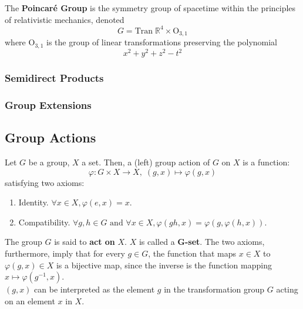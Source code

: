   \begin{example}
    The \textbf{Poincaré Group} is the symmetry group of spacetime within the principles of relativistic mechanics, denoted
    \begin{equation}
      G = \text{Tran}\; \mathbb{R}^{4} \times \text{O}_{3,1}
    \end{equation}
    where O$_{3,1}$ is the group of linear transformations preserving the polynomial 
    \begin{equation}
      x^{2} + y^{2} + z^{2} - t^{2}
    \end{equation}
  \end{example} 

\subsubsection{Semidirect Products} 

\subsubsection{Group Extensions}





\subsection{Group Actions}

  \begin{definition}
    Let $G$ be a group, $X$ a set. Then, a (left) group action of $G$ on $X$ is a function: 
    \begin{equation}
      \varphi: G \times X \longrightarrow X, \; (g,x) \longmapsto \varphi(g,x)
    \end{equation}
    satisfying two axioms:
    \begin{enumerate}
      \item Identity. $\forall x \in X, \varphi(e, x) = x$. 
      \item Compatibility. $\forall g, h \in G \text{ and } \forall x \in X, \varphi(gh, x) = \varphi(g, \varphi(h, x))$.
    \end{enumerate}
    The group $G$ is said to \textbf{act on} $X$. $X$ is called a \textbf{G-set}. The two axioms, furthermore, imply that for every $g \in G$, the function that maps $x \in X$ to $ \varphi(g, x) \in X$ is a bijective map, since the inverse is the function mapping $x \mapsto \varphi(g^{-1}, x)$. \\
    $(g, x)$ can be interpreted as the element $g$ in the transformation group $G$ acting on an element $x$ in $X$.
  \end{definition}

